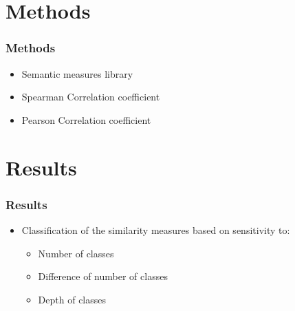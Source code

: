 \documentclass{beamer}
\begin{document}
\section{Methods}

\begin{frame}
\frametitle{Methods}
\begin{itemize}
\item Semantic measures library \cite{p2}
\item Spearman Correlation coefficient
\item Pearson Correlation coefficient
\end{itemize}
\end{frame}


\section{Results}

\begin{frame}
\frametitle{Results}
\begin{itemize}
\item Classification of the similarity measures based on sensitivity to: 
\begin{itemize}
	\item Number of classes
    \item Difference of number of classes
    \item Depth of classes
\end{itemize}
\end{itemize}
\end{frame}
\end{document}
